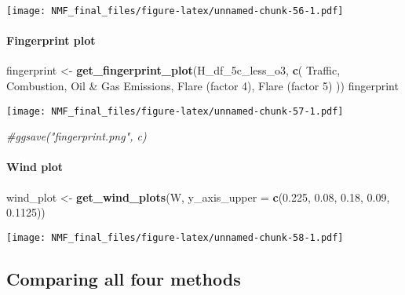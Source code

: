 \documentclass[
]{article}
\newenvironment{Shaded}{\begin{snugshade}}{\end{snugshade}}
\newcommand{\AttributeTok}[1]{\textcolor[rgb]{0.13,0.29,0.53}{#1}}
\newcommand{\CommentTok}[1]{\textcolor[rgb]{0.56,0.35,0.01}{\textit{#1}}}
\newcommand{\FloatTok}[1]{\textcolor[rgb]{0.00,0.00,0.81}{#1}}
\newcommand{\FunctionTok}[1]{\textcolor[rgb]{0.13,0.29,0.53}{\textbf{#1}}}
\newcommand{\NormalTok}[1]{#1}
\newcommand{\OtherTok}[1]{\textcolor[rgb]{0.56,0.35,0.01}{#1}}
\newcommand{\StringTok}[1]{\textcolor[rgb]{0.31,0.60,0.02}{#1}}
\begin{document}
\texttt{[image: NMF\_final\_files/figure-latex/unnamed-chunk-56-1.pdf]}

\paragraph{Fingerprint plot}\label{fingerprint-plot-3}

\begin{Shaded}
\begin{Highlighting}[]
\NormalTok{fingerprint }\OtherTok{\textless{}{-}} \FunctionTok{get\_fingerprint\_plot}\NormalTok{(H\_df\_5c\_less\_o3, }\FunctionTok{c}\NormalTok{(}
      \StringTok{\textquotesingle{}Traffic\textquotesingle{}}\NormalTok{,}
      \StringTok{\textquotesingle{}Combustion\textquotesingle{}}\NormalTok{,}
      \StringTok{\textquotesingle{}Oil \& Gas Emissions\textquotesingle{}}\NormalTok{,}
      \StringTok{\textquotesingle{}Flare (factor 4)\textquotesingle{}}\NormalTok{,}
      \StringTok{\textquotesingle{}Flare (factor 5)\textquotesingle{}}
\NormalTok{    ))}
\NormalTok{fingerprint}
\end{Highlighting}
\end{Shaded}

\texttt{[image: NMF\_final\_files/figure-latex/unnamed-chunk-57-1.pdf]}

\begin{Shaded}
\begin{Highlighting}[]
\CommentTok{\#ggsave("fingerprint.png", c)}
\end{Highlighting}
\end{Shaded}

\paragraph{Wind plot}\label{wind-plot-3}

\begin{Shaded}
\begin{Highlighting}[]
\NormalTok{wind\_plot }\OtherTok{\textless{}{-}} \FunctionTok{get\_wind\_plots}\NormalTok{(W, }\AttributeTok{y\_axis\_upper =} \FunctionTok{c}\NormalTok{(}\FloatTok{0.225}\NormalTok{, }\FloatTok{0.08}\NormalTok{, }\FloatTok{0.18}\NormalTok{, }\FloatTok{0.09}\NormalTok{, }\FloatTok{0.1125}\NormalTok{))}
\end{Highlighting}
\end{Shaded}

\texttt{[image: NMF\_final\_files/figure-latex/unnamed-chunk-58-1.pdf]}

\subsection{Comparing all four
methods}\label{comparing-all-four-methods}
\end{document}
